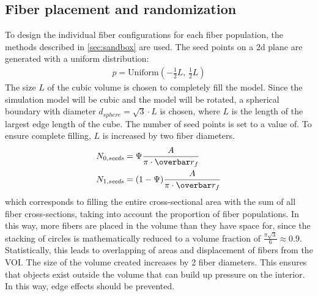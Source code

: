 \subsection{Fiber placement and randomization}
%
To design the individual fiber configurations for each fiber population, the methods described in \cref{sec:sandbox} are used.
The seed points on a 2d plane are generated with a uniform distribution:
\begin{align}
p = \mathrm{Uniform}(-\frac{1}{2}\mathit{L}, \, \frac{1}{2}\mathit{L})
\end{align}
The size $\mathit{L}$ of the cubic volume is chosen to completely fill the model.
Since the simulation model will be cubic and the model will be rotated, a spherical boundary with diameter $d_{\mathit{sphere}}=\sqrt{3} \cdot \mathit{L}$ is chosen, where $\mathit{L}$ is the length of the largest edge length of the cube.
The number of seed points is set to a value of.
To ensure complete filling, $\mathit{L}$ is increased by two fiber diameters.
\begin{align}
N_{0,\mathit{seeds}} &= \modelPsi \frac{A}{\pi \cdot \fiberRadiusMean}\\
N_{1,\mathit{seeds}} &= (1-\modelPsi) \frac{A}{\pi \cdot \fiberRadiusMean}
\end{align}
which corresponds to filling the entire cross-sectional area with the sum of all fiber cross-sections, taking into account the proportion of fiber populations.
In this way, more fibers are placed in the volume than they have space for, since the stacking of circles is mathematically reduced to a volume fraction of $\frac{\pi \sqrt{3}}{6} \approx 0.9$.
Statistically, this leads to overlapping of areas and displacement of fibers from the \ac{VOI}.
The size of the volume created increases by 2 fiber diameters.
This ensures that objects exist outside the volume that can build up pressure on the interior.
In this way, edge effects should be prevented.
\par
%

